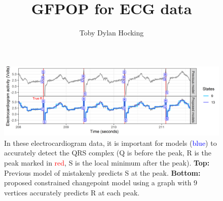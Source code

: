 \documentclass[12pt]{article}
\begin{document}
\title{GFPOP for ECG data}
\author{Toby Dylan Hocking}
\maketitle


\begin{figure}
  \includegraphics[width=\textwidth]{figure-two-ecg-graphs-data}

  
  \caption{\label{fig:ecg} In these electrocardiogram data, it is
    important for models (\textcolor{blue}{blue}) to accurately detect
    the QRS complex (Q is before the peak, R is the peak marked in
    \textcolor{red}{red}, S is the local minimum after the
    peak). \textbf{Top:} Previous model of \citet{PanTompkins1985}
    mistakenly predicts S at the peak. \textbf{Bottom:} proposed
    constrained changepoint model using a graph with 9 vertices
    accurately predicts R at each peak.}

\end{figure}
\end{document}
